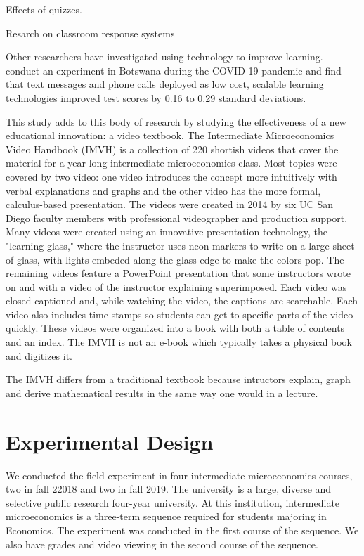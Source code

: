 \documentclass[12pt]{article}
\begin{document}
Effects of quizzes. 

Resarch on classroom response systems 

Other researchers have investigated using technology to improve learning. \textcite{nbbm2020} conduct an experiment in Botswana during the COVID-19 pandemic and find that text messages and phone calls deployed as low cost, scalable learning technologies improved test scores by 0.16 to 0.29 standard deviations. 



This study adds to this body of research by studying the effectiveness of a new educational innovation:  a video textbook.  The Intermediate Microeconomics Video Handbook (IMVH) is a collection of 220 shortish videos that cover the material for a year-long intermediate microeconomics class.  Most topics were covered by two video: one video introduces the concept more intuitively with verbal explanations and graphs and the other video has the more formal, calculus-based presentation.  The videos were created in 2014 by six UC San Diego faculty members with professional videographer and production support.  Many videos were created using an innovative presentation technology, the "learning glass," where the instructor uses neon markers to write on a large sheet of glass, with lights embeded along the glass edge to make the colors pop.  The remaining videos feature a PowerPoint presentation that some instructors wrote on and with a video of the instructor explaining superimposed.  Each video was closed captioned and, while watching the video, the captions are searchable.  Each video also includes time stamps so students can get to specific parts of the video quickly.  These videos were organized into a book with both a table of contents and an index.  The IMVH is not an e-book which typically takes a physical book and digitizes it.  

The IMVH differs from a traditional textbook because intructors explain, graph and derive mathematical results in the same way one would in a lecture.  



\section{Experimental Design} \label{expdesign}
We conducted the field experiment in four intermediate microeconomics courses, two in fall 22018 and two in fall 2019.  The university is a large, diverse and selective public research four-year university. At this institution, intermediate microeconomics is a three-term sequence required for students majoring in Economics. The experiment was conducted in the first course of the sequence.  We also have grades and video viewing in the second course of the sequence.
\end{document}
